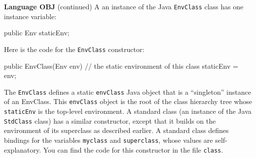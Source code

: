 \begin{minipage}[t]{\sw}
\slidenumber
\LARGE
{\bf Language OBJ} (continued)\exx
A an instance of the Java \verb'EnvClass' class
has one instance variable:
{\Large
\begin{qv}
    public Env staticEnv;
\end{qv}
}
Here is the code for the \verb'EnvClass' constructor:
{\Large
\begin{qv}
public EnvClass(Env env) {
    // the static environment of this class
    staticEnv = env;
}
\end{qv}
}
The \verb'EnvClass' defines a static \verb'envClass' Java object
that is a ``singleton'' instance of an EnvClass.
This \verb'envClass' object is the root of the class hierarchy tree
whose \verb'staticEnv' is the top-level environment.\exx
A standard class (an instance of the Java \verb'StdClass' class)
has a similar constructor,
except that it builds on the environment of its superclass
as described earlier.
A standard class defines bindings
for the variables \verb'myclass' and \verb'superclass',
whose values are self-explanatory.
You can find the code for this constructor in the file \verb'class'.
\end{minipage}

